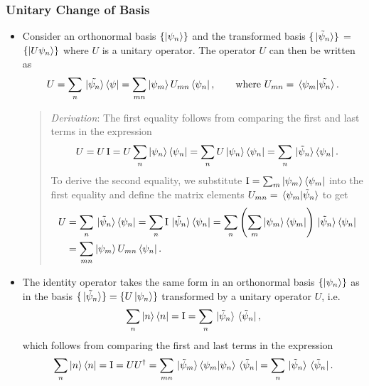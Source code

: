 \documentclass[11pt, a4paper]{article}
\renewcommand{\t}[1]{\tilde{#1}}
\newcommand{\II}{\operatorname{I}}  %
\newcommand{\p}{\psi}  %
\begin{document}
\subsubsection{Unitary Change of Basis}
\begin{itemize}
	\item Consider an orthonormal basis $ \{\ket{\p_{n}}\} $ and the transformed basis $ \{\ket*{\t{\p}_{n}}\} $ = $ \{\ket{U\p_{n}}\} $ where $ U $ is a unitary operator. The operator $ U $ can then be written as
    \begin{equation*}
        U = \sum_{n} \ket*{\tilde{\psi_{n}}}\bra{\psi} = \sum_{mn} \ket{\psi_{m}} U_{mn}\bra{\psi_{n}}, \qquad \text{where } U_{mn} = \braket*{\psi_{m}}{\tilde{\psi_{n}}}.
    \end{equation*}
    \begin{quote}
        \textit{Derivation}: The first equality follows from comparing the first and last terms in the expression
        \begin{equation*}
            U = U\II = U \sum_{n}\ket{\p_{n}}\bra{\p_{n}} = \sum_{n}U\ket{\p_{n}}\bra{\p_{n}} =  \sum_{n}\ket*{\t{\p}_{n}}\bra{\p_{n}}.
        \end{equation*}
        To derive the second equality, we substitute $  \II = \sum_{m}\ket{\p_{m}}\bra{\p_{m}} $ into the first equality and define the matrix elements $ U_{mn} = \braket*{\p_{m}}{\t{\p}_{n}} $ to get
	\begin{align*}
        U &= \sum_{n}\ket*{\t{\p}_{n}}\bra{\p_{n}} = \sum_{n}\II \ket*{\t{\p}_{n}}\bra{\p_{n}}  = \sum_{n}\left(\sum_{m}\ket{\p_{m}}\bra{\p_{m}}\right)\ket*{\t{\p}_{n}}\bra{\p_{n}} \\
        &= \sum_{mn}\ket{\p_{m}}U_{mn}\bra{\p_{n}}.
	\end{align*}

    \end{quote}

    \item The identity operator takes the same form in an orthonormal basis $ \{\ket{\p_{n}}\} $ as in the basis $ \{\ket*{\t{\p}_{n}}\} = \{U \ket{\psi_{n}}\} $ transformed by a unitary operator $ U $, i.e.
    \begin{equation*}
        \sum_{n} \ket{n} \bra{n} = \II = \sum_{n}\ket*{\t{\p}_{n}}\bra*{\t{\p}_{n}},
    \end{equation*}
    which follows from comparing the first and last terms in the expression 
	\begin{equation*}
        \sum_{n} \ket{n} \bra{n} = \II = UU^{\dagger} = \sum_{mn} \ket*{\t{\p}_{m}} \braket{\p_{m}}{\p_{n}} \bra*{\t{\p}_{n}} = \sum_{n}\ket*{\t{\p}_{n}}\bra*{\t{\p}_{n}}.
	\end{equation*}
	

\end{itemize}
\end{document}
